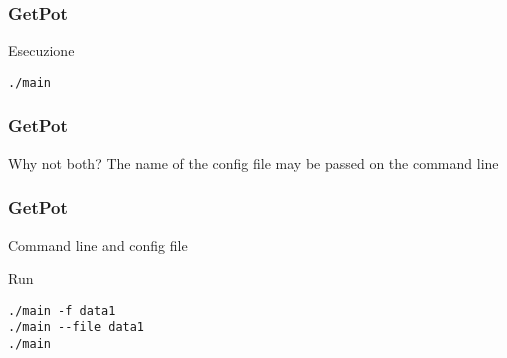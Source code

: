 \documentclass[smaller,a4paper]{beamer}
\begin{document}

\begin{frame}[fragile]

    \frametitle{GetPot}

        \begin{block}{Esecuzione}
            \begin{verbatim}
./main
            \end{verbatim}
        \end{block}

\end{frame}



\begin{frame}[fragile]

    \frametitle{GetPot}

    \begin{block}{Why not both?}
        The name of the config file may be passed on the command line
        
    \end{block}

\end{frame}


\begin{frame}[fragile]

    \frametitle{GetPot}

    \begin{block}{Command line and config file}
        \lstset{basicstyle=\scriptsize\sf}
            
        \lstset{basicstyle=\sf}
    \end{block}

\end{frame}


\begin{frame}[fragile]

    \begin{block}{Run}
        \begin{verbatim}
./main -f data1
./main --file data1
./main
        \end{verbatim}
    \end{block}

\end{frame}
\end{document}
